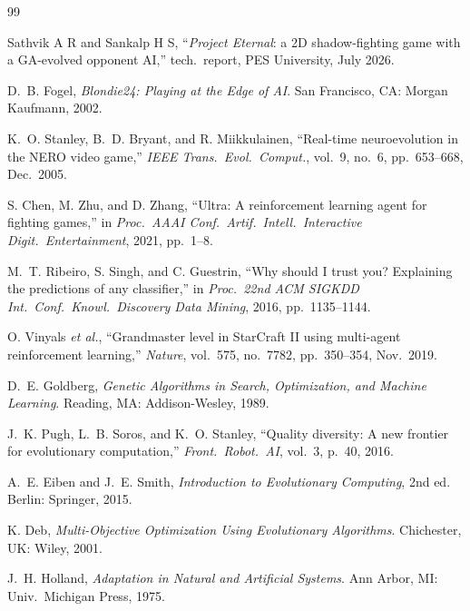 \documentclass[conference]{IEEEtran}
\begin{document}
\begin{thebibliography}{99}

Sathvik A R and Sankalp H S, ``\emph{Project Eternal}: a 2D shadow-fighting game with a GA-evolved opponent AI,'' tech.\ report, PES University, July 2026.

D.~B. Fogel, \emph{Blondie24: Playing at the Edge of AI}. San Francisco, CA: Morgan Kaufmann, 2002.

K.~O. Stanley, B.~D. Bryant, and R. Miikkulainen, ``Real-time neuroevolution in the NERO video game,'' \emph{IEEE Trans.\ Evol.\ Comput.}, vol.~9, no.~6, pp.~653--668, Dec.\ 2005.

S. Chen, M. Zhu, and D. Zhang, ``Ultra: A reinforcement learning agent for fighting games,'' in \emph{Proc.\ AAAI Conf.\ Artif.\ Intell.\ Interactive Digit.\ Entertainment}, 2021, pp.~1--8.

M.~T. Ribeiro, S. Singh, and C. Guestrin, ``Why should I trust you? Explaining the predictions of any classifier,'' in \emph{Proc.\ 22nd ACM SIGKDD Int.\ Conf.\ Knowl.\ Discovery Data Mining}, 2016, pp.~1135--1144.

O. Vinyals \emph{et al.}, ``Grandmaster level in StarCraft II using multi-agent reinforcement learning,'' \emph{Nature}, vol.~575, no.~7782, pp.~350--354, Nov.\ 2019.

D.~E. Goldberg, \emph{Genetic Algorithms in Search, Optimization, and Machine Learning}. Reading, MA: Addison-Wesley, 1989.

J.~K. Pugh, L.~B. Soros, and K.~O. Stanley, ``Quality diversity: A new frontier for evolutionary computation,'' \emph{Front.\ Robot.\ AI}, vol.~3, p.~40, 2016.

A.~E. Eiben and J.~E. Smith, \emph{Introduction to Evolutionary Computing}, 2nd ed. Berlin: Springer, 2015.

K. Deb, \emph{Multi-Objective Optimization Using Evolutionary Algorithms}. Chichester, UK: Wiley, 2001.

J.~H. Holland, \emph{Adaptation in Natural and Artificial Systems}. Ann Arbor, MI: Univ.\ Michigan Press, 1975.


\end{thebibliography}
\end{document}

